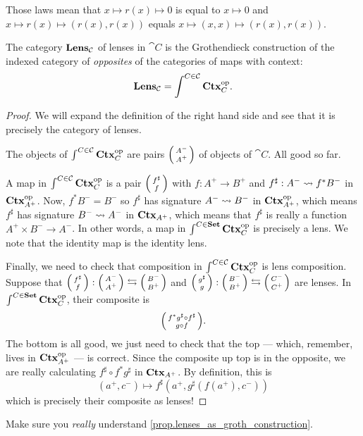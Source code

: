 \documentclass[DynamicalBook]{subfiles}
\begin{document}
Those laws mean that $x \mapsto r(x) \mapsto 0$ is equal to $x \mapsto 0$ and $x \mapsto r(x) \mapsto (r(x), r(x))$ equals $x \mapsto (x, x) \mapsto (r(x), r(x))$.


\begin{proposition}\label{prop.lenses_as_groth_construction}
  The category $\textbf{Lens}_{\mathcal{C}}$ of lenses in $\cat{C}$ is the
  Grothendieck construction of the indexed category of \emph{opposites} of the
  categories of maps with context:
  $$\textbf{Lens}_{\mathcal{C}} = \int^{C \in \mathcal{C}} \textbf{Ctx}_{C}^{\textnormal{op}}.$$
\end{proposition}
\begin{proof}
We will expand the
definition of the right hand side and see that it is precisely the category of lenses.

The objects of $\int^{C \in \mathcal{C}} \textbf{Ctx}_{C}^{\textnormal{op}}$ are pairs $\lens{A^-}{A^+}$ of
objects of $\cat{C}$. All good so far.

A map in $\int^{C \in \mathcal{C}} \textbf{Ctx}_{C}^{\textnormal{op}}$ is a pair $\lens{f^{\sharp}}{f}$
with $f : A^+ \to B^+$ and $f^{\sharp} : A^- \rightsquigarrow f^{\ast} B^-$ in
$\textbf{Ctx}_{A^+}^{\textnormal{op}}$. Now, $f^{\ast}B^- = B^-$ so $f^{\sharp}$ has signature $A^-
\rightsquigarrow B^-$ in $\textbf{Ctx}_{A^+}^{\textnormal{op}}$, which means $f^{\sharp}$ has signature $B^-
\rightsquigarrow A^{-}$ in $\textbf{Ctx}_{A^+}$, which means that $f^{\sharp}$ is really a
function $A^+ \times B^- \to A^{-}$. In other words, a map in $\int^{C \in \textbf{Set}}
\textbf{Ctx}_{C}^{\textnormal{op}}$ is precisely a lens. We note that the identity map is the identity lens.

Finally, we need to check that composition in $\int^{C \in \mathcal{C}} \textbf{Ctx}_{C}^{\textnormal{op}}$
is lens composition. Suppose that $\lens{f^{\sharp}}{f} :
  \lens{A^-}{A^+} \fromto \lens{B^-}{B^+}$ and $\lens{g^{\sharp}}{g} :
  \lens{B^-}{B^+} \fromto \lens{C^-}{C^+}$ are lenses. In $\int^{C \in \textbf{Set}}
  \textbf{Ctx}_{C}^{\textnormal{op}}$, their composite is
$$\lens{f^{\ast}g^{\sharp} \circ f^{\sharp}}{g \circ f}.$$
  The bottom is all good, we just need to check that the top --- which,
  remember, lives in $\textbf{Ctx}_{A^+}^{\textnormal{op}}$ --- is correct. Since the composite up top
  is in
  the opposite, we are really calculating $f^{\sharp} \circ f^{\ast} g^{\sharp}$
  in $\textbf{Ctx}_{A^+}$. By definition, this is
$$(a^+, c^-) \mapsto f^{\sharp}(a^+, g^{\sharp}(f(a^+), c^-))$$
which is precisely their composite as lenses!
\end{proof}

\begin{exercise}\label{ex.really_understand_charts_as_groth_construction}
  Make sure you \emph{really} understand \cref{prop.lenses_as_groth_construction}.
\end{exercise}
\end{document}
